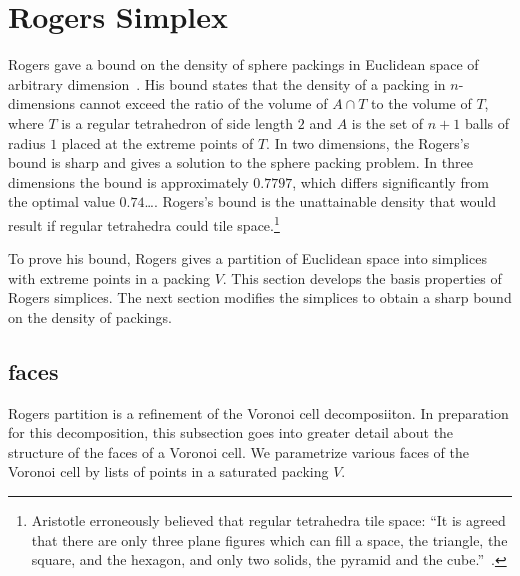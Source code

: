\section{Rogers Simplex}\label{sec:rogers}




Rogers gave a bound on the density of sphere packings in Euclidean
space of arbitrary dimension~\cite{Rogers:1958:Packing}.  His bound
states that the density of a packing in $n$-dimensions cannot exceed
the ratio of the volume of $A \cap T$ to the volume of $T$, where $T$
is a regular tetrahedron of side length $2$ and $A$ is the set of
$n+1$ balls of radius $1$ placed at the extreme points of $T$.  In two
dimensions, the Rogers's bound is sharp and gives a solution to the
sphere packing problem.  In three dimensions the bound is
approximately $0.7797$, which differs significantly from the optimal
value $0.74$\dots.  Rogers's bound is the unattainable density that
would result if regular tetrahedra could tile
space.\footnote{Aristotle erroneously  believed that regular tetrahedra
  tile space: ``It is agreed that there are only three plane figures
  which can fill a space, the triangle, the square, and the hexagon,
  and only two solids, the pyramid and the cube.''~\cite{Aristotle}.}

To prove his bound, Rogers gives a partition of Euclidean space into
simplices with extreme points in a packing $V$.  This section develops
the basis properties of Rogers simplices.  The next section modifies
the simplices to obtain a sharp bound on the density of packings.




\subsection{faces}

Rogers partition is a refinement of the Voronoi cell decomposiiton.
In preparation for this decomposition, this subsection goes into
greater detail about the structure of the faces of a Voronoi cell.  We
parametrize various faces of the Voronoi cell by lists of points in a
saturated packing $V$.

